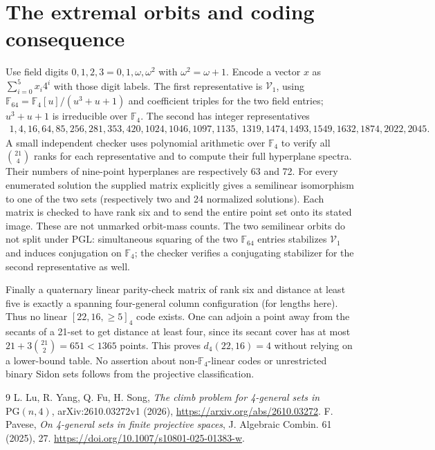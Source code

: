 \documentclass[10pt]{article}
\newcommand{\F}{\mathbb F}
\newcommand{\PGL}{\mathrm{PGL}}
\begin{document}
\section{The extremal orbits and coding consequence}
Use field digits $0,1,2,3=0,1,\omega,\omega^2$ with $\omega^2=\omega+1$. Encode a vector $x$ as $\sum_{i=0}^{5}x_i4^i$ with those digit labels. The first representative is $\mathcal V_1$, using $\F_{64}=\F_4[u]/(u^3+u+1)$ and coefficient triples for the two field entries; $u^3+u+1$ is irreducible over $\F_4$. The second has integer representatives
\[
\begin{gathered}
1,4,16,64,85,256,281,353,420,1024,1046,1097,1135,\
1319,1474,1493,1549,1632,1874,2022,2045.
\end{gathered}
\]
A small independent checker uses polynomial arithmetic over $\F_4$ to verify all $\binom{21}{4}$ ranks for each representative and to compute their full hyperplane spectra. Their numbers of nine-point hyperplanes are respectively 63 and 72. For every enumerated solution the supplied matrix explicitly gives a semilinear isomorphism to one of the two sets (respectively two and 24 normalized solutions). Each matrix is checked to have rank six and to send the entire point set onto its stated image. These are not unmarked orbit-mass counts. The two semilinear orbits do not split under $\PGL$: simultaneous squaring of the two $\F_{64}$ entries stabilizes $\mathcal V_1$ and induces conjugation on $\F_4$; the checker verifies a conjugating stabilizer for the second representative as well.

Finally a quaternary linear parity-check matrix of rank six and distance at least five is exactly a spanning four-general column configuration (for lengths here). Thus no linear $[22,16,\ge5]_4$ code exists. One can adjoin a point away from the secants of a 21-set to get distance at least four, since its secant cover has at most $21+3\binom{21}{2}=651<1365$ points. This proves $d_4(22,16)=4$ without relying on a lower-bound table. No assertion about non-$\F_4$-linear codes or unrestricted binary Sidon sets follows from the projective classification.

\begin{thebibliography}{9}
 L. Lu, R. Yang, Q. Fu, H. Song, \emph{The climb problem for 4-general sets in $\mathrm{PG}(n,4)$}, arXiv:2610.03272v1 (2026), \url{https://arxiv.org/abs/2610.03272}.
\bibitem{pav} F. Pavese, \emph{On 4-general sets in finite projective spaces}, J. Algebraic Combin. 61 (2025), 27. \url{https://doi.org/10.1007/s10801-025-01383-w}.
\end{thebibliography}
\end{document}

